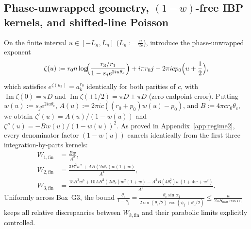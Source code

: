 \documentclass[10pt]{article}
\numberwithin{equation}{section}
\theoremstyle{plain}
\theoremstyle{definition}
\newcommand{\1}{\mathbf{1}}
\DeclareMathOperator{\im}{Im}
\begin{document}
\subsection{Phase-unwrapped geometry, \texorpdfstring{$(1-w)$}{(1-w)}-free IBP kernels, and shifted-line Poisson}
\label{sec:G3-calculus}

On the finite interval $u \in [-L_n, L_n]$ ($L_n := \frac{n}{2c}$), introduce the phase-unwrapped exponent
\begin{equation}\label{eq:zeta-G3}
\zeta(u) := r_0 n\log\!\Bigl(\frac{r_3/r_1}{1 - s_j e^{2iu\theta_c}}\Bigr) + i\pi r_0 j - 2\pi i c p_0\Bigl(u + \frac{1}{2}\Bigr),
\end{equation}
which satisfies $e^{\zeta(u_k)} = a_k^{r_0}$ identically for both parities of $c$, with $\im\zeta(0) = \pi D$ and $\im\zeta(\pm 1/2) = \pi D \pm \pi D$ (zero endpoint error). Putting $w(u) := s_j e^{2iu\theta_c}$, $A(u) := 2\pi i c((r_0 + p_0)w(u) - p_0)$, and $B := 4\pi c r_0 \theta_c$, we obtain $\zeta'(u) = A(u)/(1 - w(u))$ and $\zeta''(u) = -B w(u)/(1 - w(u))^2$. As proved in Appendix~\ref{app:regime2}, every denominator factor $(1 - w(u))$ cancels identically from the first three integration-by-parts kernels:
\begin{subequations}\label{eq:W123-fin}
\begin{align}
W_{1,\mathrm{fin}} &= \frac{Bw}{A^2}, \\
W_{2,\mathrm{fin}} &= \frac{3 B^2 w^2 + A B (2i\theta_c) w(1 + w)}{A^4}, \\
W_{3,\mathrm{fin}} &= \frac{15 B^3 w^3 + 10 A B^2 (2i\theta_c) w^2(1 + w) - A^2 B (4\theta_c^2) w(1 + 4w + w^2)}{A^6}.
\end{align}
\end{subequations}
Uniformly across Box~G3, the bound $\frac{\theta_c}{1 - s_j} = \frac{\theta_c \sin\alpha_1}{2\sin(\theta_c/2)\cos(\psi_j + \theta_c/2)} \le \frac{\kappa}{2\pi S_{\mathrm{half}}\cos\alpha_1}$ keeps all relative discrepancies between $W_{k,\mathrm{fin}}$ and their parabolic limits explicitly controlled.
\end{document}

